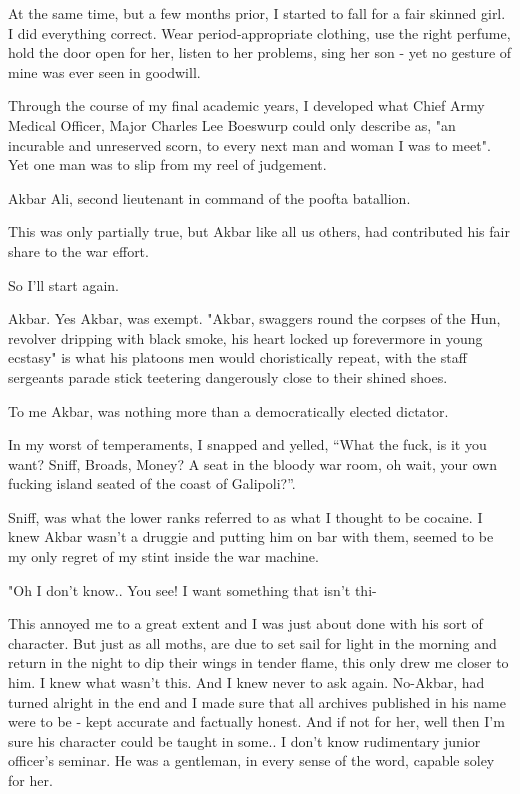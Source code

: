 \documentclass[12pt,openany]{book}
\begin{document}
At the same time, but a few months prior, I
started to fall for a fair skinned girl.
I did everything correct. Wear period-appropriate
clothing, use the right perfume, hold the
door open for her, listen to her
problems, sing her son - yet no gesture of mine
was ever seen in goodwill.

Through the course of my final academic years,
I developed what Chief Army Medical Officer,
Major Charles Lee Boeswurp could only
describe as, "an incurable and unreserved
scorn, to every next man and woman I was
to meet". Yet one man was to slip from
my reel of judgement.

Akbar Ali, second lieutenant in command
of the poofta batallion.

This was only partially true, but Akbar
like all us others, had contributed
his fair share to the war effort.

So I'll start again.

Akbar. Yes Akbar, was exempt. "Akbar, swaggers
round the corpses of the Hun, revolver
dripping with black smoke,
his heart locked up forevermore
in young ecstasy" is what his platoons
men would choristically repeat, with
the staff sergeants parade stick
teetering dangerously close to
their shined shoes.

To me Akbar, was nothing more than
a democratically elected dictator.

In my worst of temperaments, I snapped
and yelled, ``What the fuck,
is it you want? Sniff, Broads, Money?
A seat in the bloody war room, oh wait,
your own fucking island seated of
the coast of Galipoli?''.

Sniff, was what the lower ranks referred
to as what I thought to be cocaine.
I knew Akbar wasn't a druggie
and putting him on bar with them,
seemed to be my only regret of my
stint inside the war machine.

"Oh I don't know.. You see! I want
something that isn't thi-

This annoyed me to a great extent
and I was just about done with
his sort of character. But just
as all moths, are due
to set sail for light in the morning
and return in the night to dip
their wings in tender flame,
this only drew me closer to him. I knew
what wasn't this. And I knew never
to ask again. No-Akbar, had
turned alright in the end and I made
sure that all archives published
in his name were to be - kept
accurate and factually honest. And
if not for her, well then I'm sure
his character could be taught
in some.. I don't know rudimentary
junior officer's seminar. He was a
gentleman, in every sense of the word,
capable soley for her.
\end{document}
